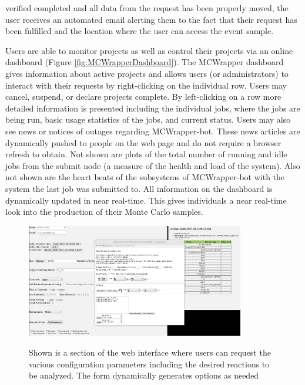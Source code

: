 verified completed and all data from the request has been properly moved, the user receives an automated email alerting them to the fact that their request has been fulfilled and the location where the user can access the event sample.\newline

Users are able to monitor projects as well as control their projects via an online dashboard (Figure \ref{fig:MCWrapperDashboard}).  The MCWrapper dashboard gives information about active projects and allows users (or administrators) to interact with their requests by right-clicking on the individual row.  Users may cancel, suspend, or declare projects complete. By left-clicking on a row more detailed information is presented including the individual jobs, where the jobs are being run, basic usage statistics of the jobs, and current status.  Users may also see news or notices of outages regarding MCWrapper-bot.  These news articles are dynamically pushed to people on the web page and do not require a browser refresh to obtain.  Not shown are plots of the total number of running and idle jobs from the submit node (a measure of the health and load of the system). Also not shown are the heart beats of the subsystems of MCWrapper-bot with the system the last job was submitted to.  All information on the dashboard is dynamically updated in near real-time.  This gives individuals a near real-time look into the production of their Monte Carlo samples.
\begin{figure}[h!]\centering
\includegraphics[width=0.85\textwidth]{figures/mcwrapper_submit_form.png}
\caption{Shown is a section of the web interface where users can request the various configuration parameters including the desired reactions to be analyzed.  The form dynamically generates options as needed}{\label{fig:MCWrapperSubmit}}
\end{figure}
